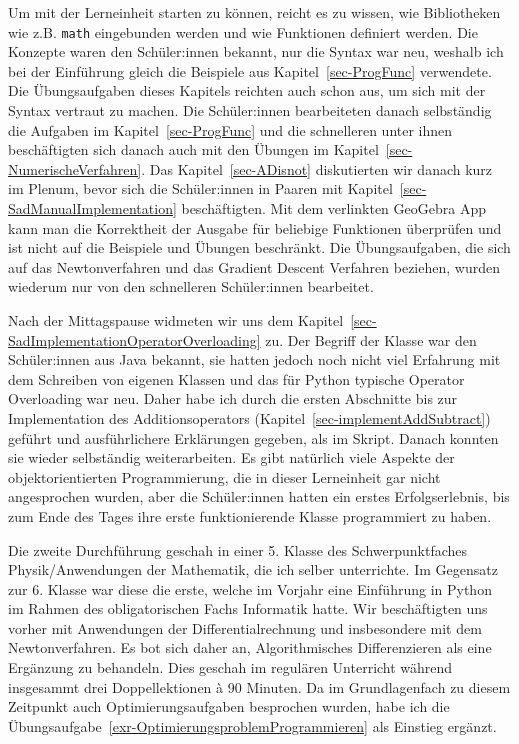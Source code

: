 \documentclass[
  a4paper,
  DIV=11]{scrreprt}
\theoremstyle{definition}
\theoremstyle{definition}
\theoremstyle{remark}
\begin{document}
Um mit der Lerneinheit starten zu können, reicht es zu wissen, wie
Bibliotheken wie z.B. \texttt{math} eingebunden werden und wie
Funktionen definiert werden. Die Konzepte waren den Schüler:innen
bekannt, nur die Syntax war neu, weshalb ich bei der Einführung gleich
die Beispiele aus Kapitel~\ref{sec-ProgFunc} verwendete. Die
Übungsaufgaben dieses Kapitels reichten auch schon aus, um sich mit der
Syntax vertraut zu machen. Die Schüler:innen bearbeiteten danach
selbständig die Aufgaben im Kapitel~\ref{sec-ProgFunc} und die
schnelleren unter ihnen beschäftigten sich danach auch mit den Übungen
im Kapitel~\ref{sec-NumerischeVerfahren}. Das Kapitel~\ref{sec-ADisnot}
diskutierten wir danach kurz im Plenum, bevor sich die Schüler:innen in
Paaren mit Kapitel~\ref{sec-SadManualImplementation} beschäftigten. Mit
dem verlinkten GeoGebra App kann man die Korrektheit der Ausgabe für
beliebige Funktionen überprüfen und ist nicht auf die Beispiele und
Übungen beschränkt. Die Übungsaufgaben, die sich auf das Newtonverfahren
und das Gradient Descent Verfahren beziehen, wurden wiederum nur von den
schnelleren Schüler:innen bearbeitet.

Nach der Mittagspause widmeten wir uns dem
Kapitel~\ref{sec-SadImplementationOperatorOverloading} zu. Der Begriff
der Klasse war den Schüler:innen aus Java bekannt, sie hatten jedoch
noch nicht viel Erfahrung mit dem Schreiben von eigenen Klassen und das
für Python typische Operator Overloading war neu. Daher habe ich durch
die ersten Abschnitte bis zur Implementation des Additionsoperators
(Kapitel~\ref{sec-implementAddSubtract}) geführt und ausführlichere
Erklärungen gegeben, als im Skript. Danach konnten sie wieder
selbständig weiterarbeiten. Es gibt natürlich viele Aspekte der
objektorientierten Programmierung, die in dieser Lerneinheit gar nicht
angesprochen wurden, aber die Schüler:innen hatten ein erstes
Erfolgserlebnis, bis zum Ende des Tages ihre erste funktionierende
Klasse programmiert zu haben.

Die zweite Durchführung geschah in einer 5. Klasse des Schwerpunktfaches
Physik/Anwendungen der Mathematik, die ich selber unterrichte. Im
Gegensatz zur 6. Klasse war diese die erste, welche im Vorjahr eine
Einführung in Python im Rahmen des obligatorischen Fachs Informatik
hatte. Wir beschäftigten uns vorher mit Anwendungen der
Differentialrechnung und insbesondere mit dem Newtonverfahren. Es bot
sich daher an, Algorithmisches Differenzieren als eine Ergänzung zu
behandeln. Dies geschah im regulären Unterricht während insgesammt drei
Doppellektionen à 90 Minuten. Da im Grundlagenfach zu diesem Zeitpunkt
auch Optimierungsaufgaben besprochen wurden, habe ich die
Übungsaufgabe~\ref{exr-OptimierungsproblemProgrammieren} als Einstieg
ergänzt.
\end{document}
